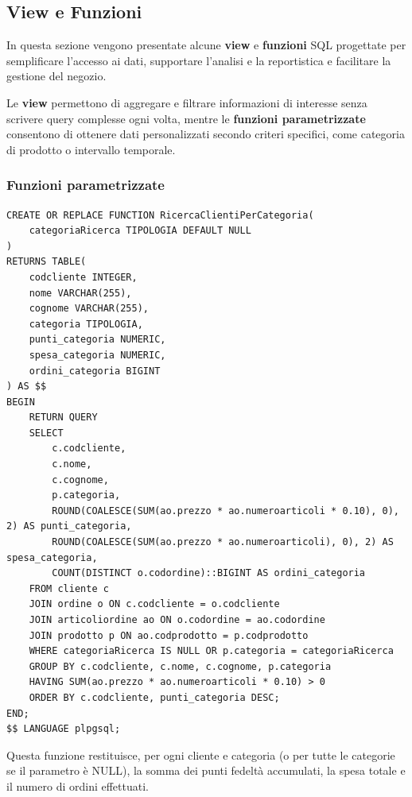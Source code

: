 \documentclass[a4paper,12pt]{article}
\begin{document}
\subsection{View e Funzioni}
\label{sec:view-funzioni}
\noindent
In questa sezione vengono presentate alcune \textbf{view} e \textbf{funzioni} SQL progettate per semplificare l'accesso ai dati, supportare l'analisi e la reportistica e facilitare la gestione del negozio.  

Le \textbf{view} permettono di aggregare e filtrare informazioni di interesse senza scrivere query complesse ogni volta, mentre le \textbf{funzioni parametrizzate} consentono di ottenere dati personalizzati secondo criteri specifici, come categoria di prodotto o intervallo temporale.

\subsubsection{Funzioni parametrizzate}

\begin{lstlisting}[style=sqlstyle]
CREATE OR REPLACE FUNCTION RicercaClientiPerCategoria(
    categoriaRicerca TIPOLOGIA DEFAULT NULL
)
RETURNS TABLE(
    codcliente INTEGER,
    nome VARCHAR(255),
    cognome VARCHAR(255),
    categoria TIPOLOGIA,
    punti_categoria NUMERIC,
    spesa_categoria NUMERIC,
    ordini_categoria BIGINT
) AS $$
BEGIN
    RETURN QUERY
    SELECT 
        c.codcliente,
        c.nome,
        c.cognome,
        p.categoria,
        ROUND(COALESCE(SUM(ao.prezzo * ao.numeroarticoli * 0.10), 0), 2) AS punti_categoria,
        ROUND(COALESCE(SUM(ao.prezzo * ao.numeroarticoli), 0), 2) AS spesa_categoria,
        COUNT(DISTINCT o.codordine)::BIGINT AS ordini_categoria
    FROM cliente c
    JOIN ordine o ON c.codcliente = o.codcliente
    JOIN articoliordine ao ON o.codordine = ao.codordine
    JOIN prodotto p ON ao.codprodotto = p.codprodotto
    WHERE categoriaRicerca IS NULL OR p.categoria = categoriaRicerca
    GROUP BY c.codcliente, c.nome, c.cognome, p.categoria
    HAVING SUM(ao.prezzo * ao.numeroarticoli * 0.10) > 0
    ORDER BY c.codcliente, punti_categoria DESC;
END;
$$ LANGUAGE plpgsql;
\end{lstlisting}

\noindent
Questa funzione restituisce, per ogni cliente e categoria (o per tutte le categorie se il parametro è NULL), la somma dei punti fedeltà accumulati, la spesa totale e il numero di ordini effettuati.  
\end{document}
